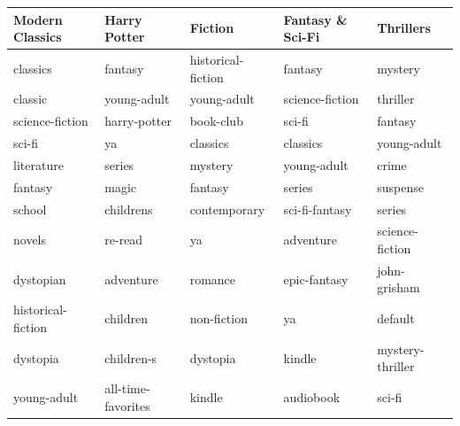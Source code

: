\documentclass[handout]{beamer}
\begin{document}
\begin{frame}
 \begin{table}
\centering
\centering
\begin{tabular}{lllHZ}
\toprule
    Modern Classics &        Harry Potter &             Fiction & Fantasy \& Sci-Fi &         Thrillers \\
\midrule
           classics &             fantasy &  historical-fiction &          fantasy &           mystery \\
            classic &         young-adult &         young-adult &  science-fiction &          thriller \\
    science-fiction &        harry-potter &           book-club &           sci-fi &           fantasy \\
             sci-fi &                  ya &            classics &         classics &       young-adult \\
         literature &              series &             mystery &      young-adult &             crime \\
            fantasy &               magic &             fantasy &           series &          suspense \\
             school &           childrens &        contemporary &   sci-fi-fantasy &            series \\
             novels &             re-read &                  ya &        adventure &   science-fiction \\
          dystopian &           adventure &             romance &     epic-fantasy &      john-grisham \\
 historical-fiction &            children &         non-fiction &               ya &           default \\
           dystopia &          children-s &            dystopia &           kindle &  mystery-thriller \\
        young-adult &  all-time-favorites &              kindle &        audiobook &            sci-fi \\
\bottomrule
\end{tabular}\end{table}
\end{frame}
\end{document}
